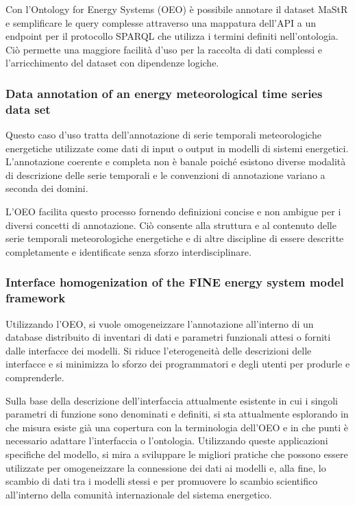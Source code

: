 Con l'Ontology
for Energy Systems (OEO) è possibile annotare il dataset MaStR e semplificare
le query complesse attraverso una mappatura dell'API a un endpoint per il
protocollo SPARQL che utilizza i termini definiti nell'ontologia. Ciò permette
una maggiore facilità d'uso per la raccolta di dati complessi e l'arricchimento
del dataset con dipendenze logiche.

\subsubsection{Data annotation of an energy meteorological time series data
    set}

Questo caso d'uso tratta dell'annotazione di serie temporali meteorologiche
energetiche utilizzate come
dati di input o output in modelli di sistemi energetici. L'annotazione coerente
e completa non è banale poiché esistono diverse modalità
di descrizione delle serie temporali e le convenzioni di annotazione variano a
seconda dei domini.

L'OEO facilita questo processo fornendo definizioni concise e non ambigue per i
diversi concetti di annotazione. Ciò consente alla struttura e al contenuto
delle serie temporali meteorologiche energetiche e di altre discipline di
essere descritte completamente e identificate senza sforzo interdisciplinare.

\subsubsection{Interface homogenization of the FINE energy system model
    framework}

Utilizzando l'OEO, si vuole omogeneizzare l'annotazione all'interno di un
database distribuito di inventari di dati e parametri funzionali attesi o
forniti dalle interfacce dei modelli.
Si riduce l'eterogeneità delle descrizioni delle interfacce e si minimizza lo
sforzo dei programmatori e
degli utenti per produrle e comprenderle.

Sulla base della descrizione dell'interfaccia attualmente esistente in cui i
singoli parametri di funzione sono denominati e definiti, si sta attualmente
esplorando in che misura esiste già una copertura con la terminologia dell'OEO
e in che punti è necessario adattare l'interfaccia o l'ontologia. Utilizzando
queste applicazioni specifiche del modello, si mira a sviluppare le migliori
pratiche che possono essere utilizzate per omogeneizzare la connessione dei
dati ai modelli e, alla fine, lo scambio di dati tra i modelli stessi e per
promuovere lo scambio scientifico all'interno della comunità internazionale del
sistema energetico.

